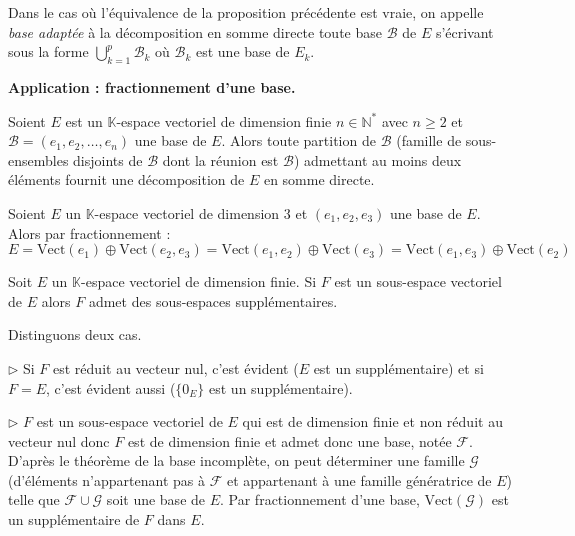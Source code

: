 \documentclass[a4paper,10pt]{report}
\begin{document}
\begin{Definition}{} Dans le cas où l'équivalence de la proposition précédente est vraie, on appelle \emph{base adaptée} à la décomposition en somme directe toute base $\mathcal{B}$ de $E$ s'écrivant sous la forme $\bigcup_{k=1}^p \mathcal{B}_k$ où $\mathcal{B}_k$ est une base de $E_k$.
\end{Definition}

\textbf{Application : fractionnement d'une base.}

Soient $E$ est un $\mathbb{K}$-espace vectoriel de dimension finie $n \in \mathbb{N}^*$ avec $n \geq 2$ et $\mathcal{B}=(e_1, e_2, \ldots, e_n)$ une base de $E$. Alors toute partition de $\mathcal{B}$ (famille de sous-ensembles disjoints de $\mathcal{B}$ dont la réunion est $\mathcal{B}$) admettant au moins deux éléments fournit une décomposition de $E$ en somme directe.

\medskip

\begin{Exemple} Soient $E$ un $\mathbb{K}$-espace vectoriel de dimension $3$ et $(e_1,e_2,e_3)$ une base de $E$. Alors par fractionnement :
$$ E = \textrm{Vect}(e_1) \oplus \textrm{Vect}(e_2,e_3) = \textrm{Vect}(e_1,e_2) \oplus \textrm{Vect}(e_3) = \textrm{Vect}(e_1,e_3) \oplus \textrm{Vect}(e_2) $$
\end{Exemple}

\medskip

\begin{Corollaire}{} Soit $E$ un $\mathbb{K}$-espace vectoriel de dimension finie. Si $F$ est un sous-espace vectoriel de $E$ alors $F$ admet des sous-espaces supplémentaires.
\end{Corollaire}

\begin{Demonstration}{} Distinguons deux cas.

$\rhd$ Si $F$ est réduit au vecteur nul, c'est évident ($E$ est un supplémentaire) et si $F=E$, c'est évident aussi ($\lbrace 0_E\rbrace$ est un supplémentaire).

\medskip

$\rhd$ $F$ est un sous-espace vectoriel de $E$ qui est de dimension finie et non réduit au vecteur nul donc $F$ est de dimension finie et admet donc une base, notée $\mathcal{F}$. D'après le théorème de la base incomplète, on peut déterminer une famille $\mathcal{G}$ (d'éléments n'appartenant pas à $\mathcal{F}$ et appartenant à une famille génératrice de $E$) telle que $\mathcal{F} \cup \mathcal{G}$ soit une base de $E$. Par fractionnement d'une base, $\textrm{Vect}(\mathcal{G})$ est un supplémentaire de $F$ dans $E$.
\end{Demonstration}
\end{document}
